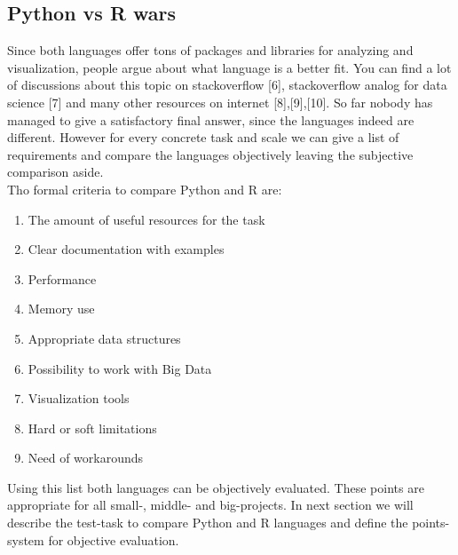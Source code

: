 \documentclass{article}
\begin{document}
\subsection{Python vs R wars}
Since both languages offer tons of packages and libraries for analyzing and visualization, people argue about what language is a better fit. You can find a lot of discussions about this topic on stackoverflow [6], stackoverflow analog for data science [7] and many other resources on internet [8],[9],[10].
So far nobody has managed to give a satisfactory final answer, since the languages indeed are different. However for every concrete task and scale we can give a list of requirements and compare the languages objectively leaving the subjective comparison aside.\\
Tho formal criteria to compare Python and R are:
\begin{enumerate}
    \item The amount of useful resources for the task
    \item Clear documentation with examples
    \item Performance
    \item Memory use
    \item Appropriate data structures
    \item Possibility to work with Big Data
    \item Visualization tools
    \item Hard or soft limitations
    \item Need of workarounds
\end{enumerate}
Using this list both languages can be objectively evaluated. These points are appropriate for all small-, middle- and big-projects. In next section we will describe the test-task to compare Python and R languages and define the points-system for objective evaluation.\\
\end{document}
